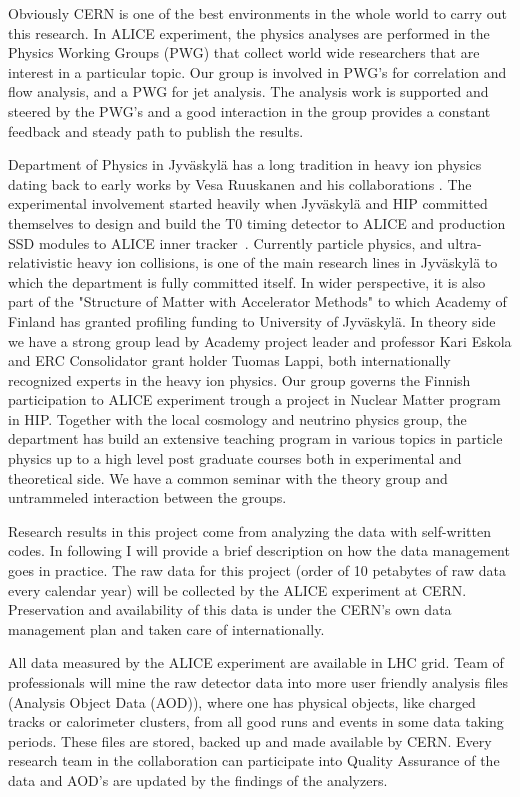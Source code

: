 Obviously CERN is one of the best environments in the whole world to carry out this research. In ALICE experiment, the physics analyses are performed in the Physics Working Groups (PWG) that collect world wide researchers that are interest in a particular topic. Our group is involved in PWG's for correlation and flow analysis, and a PWG for jet analysis. The analysis work is supported and steered by the PWG's and a good interaction in the group provides a constant feedback and steady path to publish the results.

Department of Physics in Jyv\"askyl\"a has a long tradition in heavy ion physics dating back to early works by Vesa Ruuskanen and his collaborations \cite{VonGersdorff:1986tqh}. The experimental involvement started heavily when Jyv\"askyl\"a and HIP committed themselves to design and build the T0 timing detector to ALICE and production SSD modules to ALICE inner tracker~\cite{Dellacasa:1999kf}. Currently particle physics, and ultra-relativistic heavy ion collisions, is one of the main research lines in Jyv\"askyl\"a to which the department is fully committed itself. In wider perspective, it is also part of the "Structure of Matter with Accelerator Methods" to which Academy of Finland has granted profiling funding to University of Jyv\"askyl\"a. In theory side we have a strong group lead by Academy project leader and professor Kari Eskola and ERC Consolidator grant holder Tuomas Lappi, both internationally recognized experts in the heavy ion physics. Our group governs the Finnish participation to ALICE experiment trough a project in Nuclear Matter program in HIP. Together with the local cosmology and neutrino physics group, the department has build an extensive teaching program in various topics in particle physics up to a high level post graduate courses both in experimental and theoretical side. We have a common seminar with the theory group and untrammeled interaction between the groups.

Research results in this project come from analyzing the data with self-written codes. In following I will provide a brief description on how the data management goes in practice.  The raw data for this project (order of 10 petabytes of raw data every calendar year) will be collected by the ALICE experiment at CERN. Preservation and availability of this data is under the CERN's own data management plan and taken care of internationally.

All data measured by the ALICE experiment are available in LHC grid. Team of professionals will mine the raw detector data into more user friendly analysis files (Analysis Object Data (AOD)), where one has physical objects, like charged tracks or calorimeter clusters, from all good runs and events in some data taking periods. These files are stored, backed up and made available by CERN. Every research team in the collaboration can participate into Quality Assurance of the data and AOD's are updated by the findings of the analyzers.

